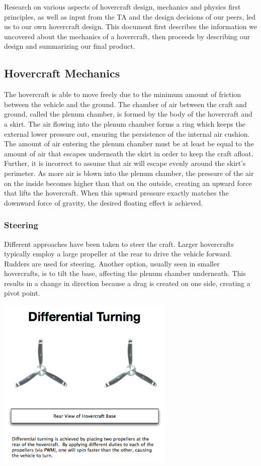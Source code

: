 Research on various aspects of hovercraft design, mechanics and physics first principles, as well as input from the TA and the design decisions of our peers, led us to our own hovercraft design. This document first describes the information we uncovered about the mechanics of a hovercraft, then proceeds by describing our design and summarizing our final product.

\subsection{Hovercraft Mechanics}
The hovercraft is able to move freely due to the minimum amount of friction between the vehicle and the ground. The chamber of air between the craft and ground, called the plenum chamber, is formed by the body of the hovercraft and a skirt. The air flowing into the plenum chamber forms a ring which keeps the external lower pressure out, ensuring the persistence of the internal air cushion. The amount of air entering the plenum chamber must be at least be equal to the amount of air that escapes underneath the skirt in order to keep the craft afloat. Further, it is incorrect to assume that air will escape evenly around the skirt’s perimeter. As more air is blown into the plenum chamber, the pressure of the air on the inside becomes higher than that on the outside, creating an upward force that lifts the hovercraft. When this upward pressure exactly matches the downward force of gravity, the desired floating effect is achieved. \cite{CambridgeJournals:370274} \cite{831309}

\subsubsection{Steering}
Different approaches have been taken to steer the craft. Larger hovercrafts typically employ a large propeller at the rear to drive the vehicle forward. Rudders are used for steering. Another option, usually seen in smaller hovercrafts, is to tilt the base, affecting the plenum chamber underneath. This results in a change in direction because a drag is created on one side, creating a pivot point.


  \begin{center}
    \includegraphics[width=85mm]{imageSources/differentialTurning.png}
  \end{center}
  \label{differentialTurning}


